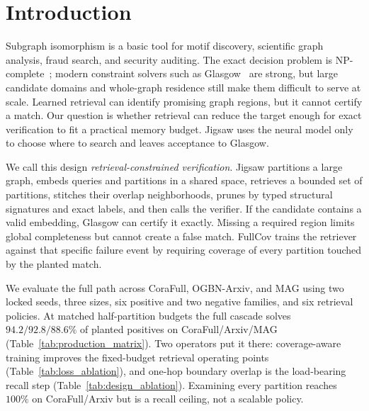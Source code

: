 \documentclass[sigconf, nonacm]{acmart}
\begin{document}
\maketitle

\vldbtopmatter

\section{Introduction}

Subgraph isomorphism is a basic tool for motif discovery, scientific graph analysis, fraud search, and security auditing. The exact decision problem is NP-complete~\cite{ref_garey}; modern constraint solvers such as Glasgow~\cite{ref_glasgow} are strong, but large candidate domains and whole-graph residence still make them difficult to serve at scale. Learned retrieval can identify promising graph regions, but it cannot certify a match. Our question is whether retrieval can reduce the target enough for exact verification to fit a practical memory budget. Jigsaw uses the neural model only to choose where to search and leaves acceptance to Glasgow.

We call this design \emph{retrieval-constrained verification}. Jigsaw partitions a large graph, embeds queries and partitions in a shared space, retrieves a bounded set of partitions, stitches their overlap neighborhoods, prunes by typed structural signatures and exact labels, and then calls the verifier. If the candidate contains a valid embedding, Glasgow can certify it exactly. Missing a required region limits global completeness but cannot create a false match. FullCov trains the retriever against that specific failure event by requiring coverage of every partition touched by the planted match.

We evaluate the full path across CoraFull, OGBN-Arxiv, and MAG using two locked seeds, three sizes, six positive and two negative families, and six retrieval policies. At matched half-partition budgets the full cascade solves $94.2/92.8/88.6\%$ of planted positives on CoraFull/Arxiv/MAG (Table~\ref{tab:production_matrix}). Two operators put it there: coverage-aware training improves the fixed-budget retrieval operating points (Table~\ref{tab:loss_ablation}), and one-hop boundary overlap is the load-bearing recall step (Table~\ref{tab:design_ablation}). Examining every partition reaches $100\%$ on CoraFull/Arxiv but is a recall ceiling, not a scalable policy.
\end{document}
